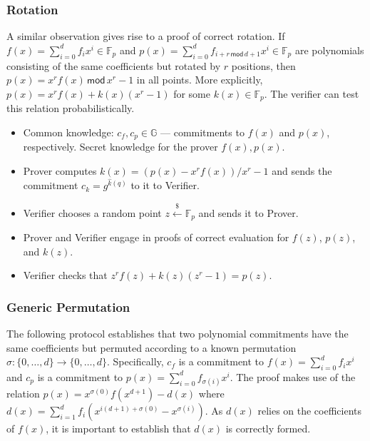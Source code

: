 \documentclass{article}
\begin{document}
\subsubsection{Rotation}

A similar observation gives rise to a proof of correct rotation. If $f(x) = \sum_{i=0}^d f_i x^i \in \mathbb{F}_p$ and $p(x) = \sum_{i=0}^d f_{i+r \, \mathsf{mod} \, d+1} x^i \in \mathbb{F}_p$ are polynomials consisting of the same coefficients but rotated by $r$ positions, then $p(x) = x^r f(x) \, \mathsf{mod} \, x^r - 1$ in all points. More explicitly, $p(x) = x^r f(x) + k(x) (x^r - 1)$ for some $k(x) \in \mathbb{F}_p$. The verifier can test this relation probabilistically.

\begin{itemize}
    \item Common knowledge: $c_f, c_p \in \mathbb{G}$ --- commitments to $f(x)$ and $p(x)$, respectively. Secret knowledge for the prover $f(x), p(x)$.
    \item Prover computes $k(x) = (p(x) - x^r f(x)) / x^r - 1$ and sends the commitment $c_k = g^{\hat{k}(q)}$ to it to Verifier.
    \item Verifier chooses a random point $z \xleftarrow{\$} \mathbb{F}_p$ and sends it to Prover.
    \item Prover and Verifier engage in proofs of correct evaluation for $f(z)$, $p(z)$, and $k(z)$.
    \item Verifier checks that $z^r f(z) + k(z) (z^r-1) = p(z)$.
\end{itemize}

\subsubsection{Generic Permutation}

The following protocol establishes that two polynomial commitments have the same coefficients but permuted according to a known permutation $\sigma : \{0,\ldots,d\} \rightarrow \{0,\ldots,d\}$. Specifically, $c_f$ is a commitment to $f(x) = \sum_{i=0}^d f_i x^i$ and $c_p$ is a commitment to $p(x) = \sum_{i=0}^d f_{\sigma(i)} x^i$. The proof makes use of the relation $p(x) = x^{\sigma(0)} f(x^{d+1}) - d(x)$ where $d(x) = \sum_{i=1}^d f_i (x^{i(d+1) + \sigma(0)} - x^{\sigma(i)})$. As $d(x)$ relies on the coefficients of $f(x)$, it is important to establish that $d(x)$ is correctly formed.
\end{document}
